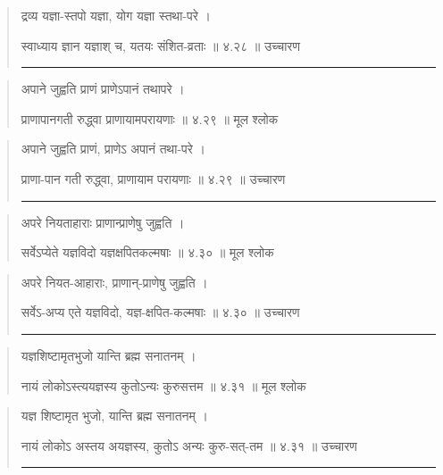 \begin{quotation}
द्रव्य यज्ञा-स्तपो यज्ञा, योग यज्ञा स्तथा-परे  ।  

स्वाध्याय ज्ञान यज्ञाश् च, यतयः संशित-व्रताः  ॥ ४.२८ ॥  उच्चारण

\noindent\rule{16cm}{0.4pt} 
\end{quotation}


\begin{quotation}

अपाने जुह्वति प्राणं प्राणेऽपानं तथापरे  ।  

प्राणापानगती रुद्ध्वा प्राणायामपरायणाः  ॥ ४.२९ ॥  मूल श्लोक
\end{quotation}

\begin{quotation}

अपाने जुह्वति प्राणं, प्राणेऽ अपानं तथा-परे  ।  

प्राणा-पान गती रुद्ध्वा, प्राणायाम परायणाः  ॥ ४.२९ ॥  उच्चारण

\noindent\rule{16cm}{0.4pt} 
\end{quotation}


\begin{quotation}

अपरे नियताहाराः प्राणान्प्राणेषु जुह्वति  ।  

सर्वेऽप्येते यज्ञविदो यज्ञक्षपितकल्मषाः  ॥ ४.३० ॥  मूल श्लोक
\end{quotation}

\begin{quotation}

अपरे नियत-आहाराः, प्राणान्-प्राणेषु जुह्वति  ।  

सर्वेऽ-अप्य एते यज्ञविदो, यज्ञ-क्षपित-कल्मषाः  ॥ ४.३० ॥  उच्चारण

\noindent\rule{16cm}{0.4pt} 
\end{quotation}


\begin{quotation}

यज्ञशिष्टामृतभुजो यान्ति ब्रह्म सनातनम्‌  ।  

नायं लोकोऽस्त्ययज्ञस्य कुतोऽन्यः कुरुसत्तम  ॥ ४.३१ ॥  मूल श्लोक
\end{quotation}

\begin{quotation}

यज्ञ शिष्टामृत भुजो, यान्ति ब्रह्म सनातनम्‌  ।  

नायं लोकोऽ अस्तय अयज्ञस्य, कुतोऽ अन्यः कुरु-सत्-तम  ॥ ४.३१ ॥  उच्चारण

\noindent\rule{16cm}{0.4pt} 
\end{quotation}


